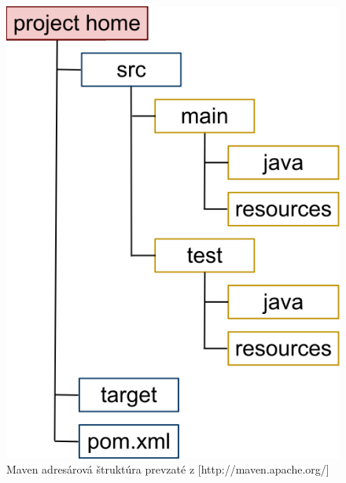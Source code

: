 \begin{figure}[htb]

\begin{center}

\includegraphics[scale=0.5]{maven.jpg} 
\caption{Maven adresárová štruktúra  prevzaté z [http://maven.apache.org/] }
\label{maven}

\end{center}

\end{figure}
